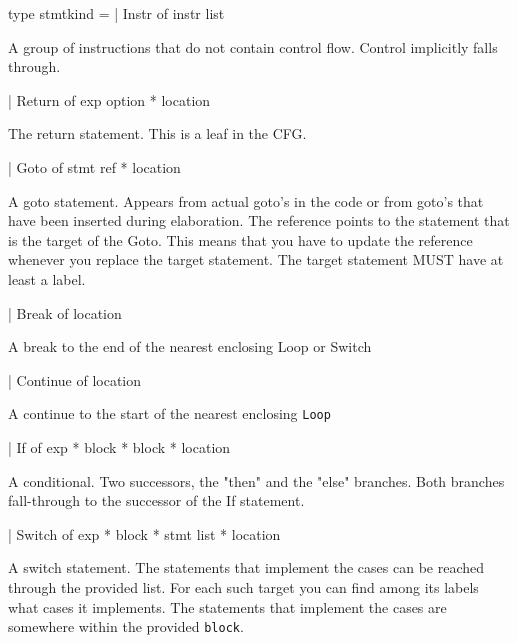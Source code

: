 \documentclass[11pt]{article}
\begin{document}
\label{type:Cil.stmtkind}\begin{ocamldoccode}
type stmtkind =
  | Instr of instr list
\end{ocamldoccode}
\begin{ocamldoccomment}
A group of instructions that do not contain control flow. Control 
 implicitly falls through.
\end{ocamldoccomment}
\begin{ocamldoccode}
  | Return of exp option * location
\end{ocamldoccode}
\begin{ocamldoccomment}
The return statement. This is a leaf in the CFG.
\end{ocamldoccomment}
\begin{ocamldoccode}
  | Goto of stmt ref * location
\end{ocamldoccode}
\begin{ocamldoccomment}
A goto statement. Appears from actual goto's in the code or from 
 goto's that have been inserted during elaboration. The reference 
 points to the statement that is the target of the Goto. This means that 
 you have to update the reference whenever you replace the target 
 statement. The target statement MUST have at least a label.
\end{ocamldoccomment}
\begin{ocamldoccode}
  | Break of location
\end{ocamldoccode}
\begin{ocamldoccomment}
A break to the end of the nearest enclosing Loop or Switch
\end{ocamldoccomment}
\begin{ocamldoccode}
  | Continue of location
\end{ocamldoccode}
\begin{ocamldoccomment}
A continue to the start of the nearest enclosing {\tt{Loop}}
\end{ocamldoccomment}
\begin{ocamldoccode}
  | If of exp * block * block * location
\end{ocamldoccode}
\begin{ocamldoccomment}
A conditional. Two successors, the "then" and the "else" branches. 
 Both branches fall-through to the successor of the If statement.
\end{ocamldoccomment}
\begin{ocamldoccode}
  | Switch of exp * block * stmt list * location
\end{ocamldoccode}
\begin{ocamldoccomment}
A switch statement. The statements that implement the cases can be 
 reached through the provided list. For each such target you can find 
 among its labels what cases it implements. The statements that 
 implement the cases are somewhere within the provided {\tt{block}}.
\end{ocamldoccomment}
\end{document}
